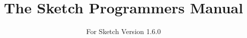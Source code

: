 \documentclass{article}
\begin{document}

\title{The Sketch Programmers Manual}
\date{For Sketch Version 1.6.0}
\maketitle





\let\glossarysection=\section
\renewcommand{\glossarypreamble}{\label{glossary}This is a glossary of flags}
\printglossary[title=Glossary of Flags]
\end{document}
